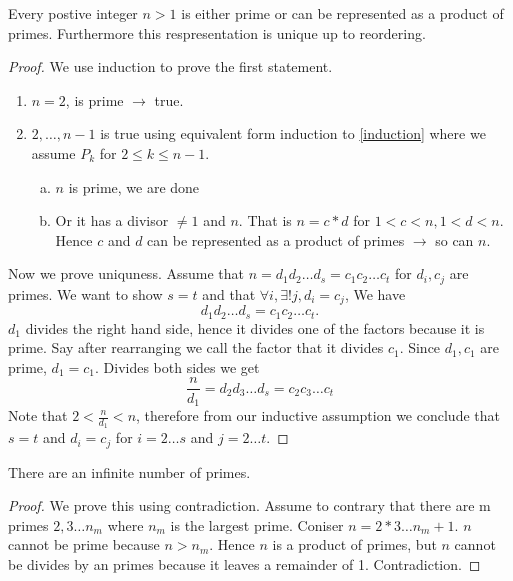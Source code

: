 \begin{theorem}
	Every postive integer \( n > 1 \) is either prime or can be represented as a product of
	primes. Furthermore this respresentation is unique up to reordering.
	\label{PrimeFactorization}
\end{theorem}

\begin{proof}
	We use induction to prove the first statement.
	\begin{enumerate}
		\item \( n=2 \), is prime \( \rightarrow \) true.
		\item \( 2, \dots, n-1 \) is true using equivalent form induction to \ref{induction}
			where we assume \( P_k \) for
			\( 2 \le k \le n-1 \).
			\begin{enumerate}[a.]
				\item \( n \) is prime, we are done
				\item Or it has a divisor \( \not = 1 \) and \( n \). That is \( n = c * d \)
					for \( 1 < c < n, 1 < d < n \). Hence \( c \) and \( d \) can be represented
					as a product of primes \( \rightarrow \) so can \( n \).
			\end{enumerate}
	\end{enumerate}
	Now we prove uniquness. Assume that \( n = d_1 d_2 \dots d_s = c_1 c_2 \dots c_t \) for 
	\( d_i, c_j \) are primes. We want to show \( s=t \) and that \( \forall i, \exists ! j, d_i = c_j \), 
	We have 
	\[ 
		d_1d_2 \dots d_s = c_1 c_2 \dots c_t.
	\]
	\( d_1 \) divides the right hand side, hence it divides one of the factors because it is
	prime. Say after rearranging we call the factor that it divides \( c_1 \). Since \( d_1, c_1
	\) are prime, \( d_1 = c_1 \). Divides both sides we get
	\[
		\frac{n}{d_1} = d_2 d_3 \dots d_s = c_2 c_3 \dots c_t
	\]
	Note that \( 2 < \frac{n}{d_1} < n \), therefore from our inductive assumption we conclude
	that \( s = t \) and \( d_i = c_j \) for \( i = 2 \dots s \) and \( j = 2 \dots t \). 
\end{proof}

\begin{theorem}
	There are an infinite number of primes.
	\label{Infinite Primes}
\end{theorem}

\begin{proof}
	We prove this using contradiction. Assume to contrary that there are m primes \( 2, 3 \dots
	n_m\) where \( n_m \) is the largest prime. Coniser \( n = 2 * 3 \dots n_m + 1 \). 
	\( n \) cannot be prime because \( n > n_m \). Hence \( n \) is a product of primes, but \(
	n \) cannot be divides by an primes because it leaves a remainder of 1. Contradiction.
\end{proof}

